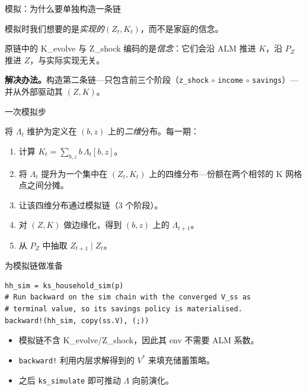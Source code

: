 \documentclass[10pt,aspectratio=169]{beamer}
\begin{document}
\begin{frame}{模拟：为什么要单独构造一条链}

模拟时我们想要的是\emph{实现的}$(Z_t, K_t)$，而不是家庭的信念。

\smallskip

原链中的 K\_evolve 与 Z\_shock 编码的是\emph{信念}：它们会沿 ALM 推进 $K$，沿 $P_Z$ 推进 $Z$，与实际实现无关。

\smallskip

\textbf{解决办法。}构造第二条链---只包含前三个阶段（\texttt{z\_shock} $\circ$ \texttt{income} $\circ$ \texttt{savings}）---并从外部驱动其 $(Z, K)$。

\end{frame}

\begin{frame}{一次模拟步}

将 $\Lambda_t$ 维护为定义在 $(b, z)$ 上的\emph{二维}分布。每一期：
\begin{enumerate}
  \item 计算 $K_t = \sum_{b, z} b\, \Lambda_t[b, z]$。
  \item 将 $\Lambda_t$ 提升为一个集中在 $(Z_t, K_t)$ 上的四维分布---份额在两个相邻的 K 网格点之间分摊。
  \item 让该四维分布通过模拟链（3 个阶段）。
  \item 对 $(Z, K)$ 做边缘化，得到 $(b, z)$ 上的 $\Lambda_{t+1}$。
  \item 从 $P_Z$ 中抽取 $Z_{t+1} \mid Z_t$。
\end{enumerate}

\end{frame}

\begin{frame}[fragile]{为模拟链做准备}
\begin{lstlisting}
hh_sim = ks_household_sim(p)
# Run backward on the sim chain with the converged V_ss as
# terminal value, so its savings policy is materialised.
backward!(hh_sim, copy(ss.V), (;))
\end{lstlisting}

\vspace{0.4em}

\begin{itemize}
  \item 模拟链不含 K\_evolve/Z\_shock，因此其 env 不需要 ALM 系数。
  \item \texttt{backward!} 利用内层求解得到的 $V^*$ 来填充储蓄策略。
  \item 之后 \texttt{ks\_simulate} 即可推动 $\Lambda$ 向前演化。
\end{itemize}

\end{frame}
\end{document}
